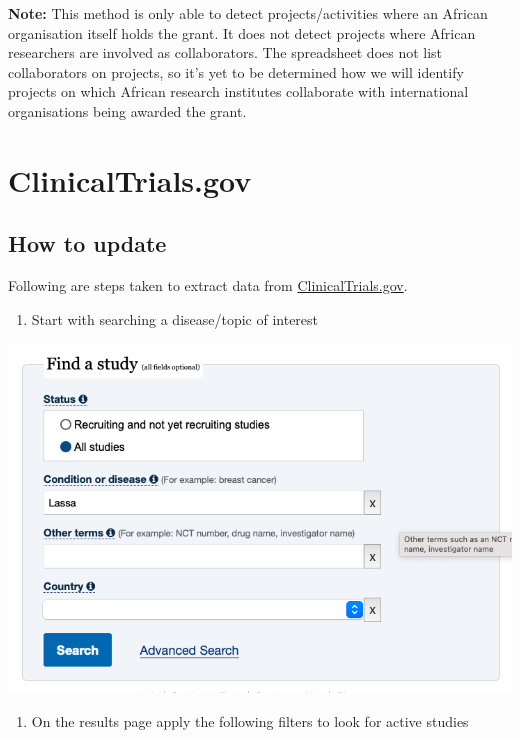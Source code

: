 \documentclass[
]{book}
\providecommand{\tightlist}{%
  \setlength{\itemsep}{0pt}\setlength{\parskip}{0pt}}
\begin{document}
\textbf{Note:} This method is only able to detect projects/activities where an African organisation itself holds the grant. It does not detect projects where African researchers are involved as collaborators. The spreadsheet does not list collaborators on projects, so it's yet to be determined how we will identify projects on which African research institutes collaborate with international organisations being awarded the grant.

\hypertarget{update-clinicaltrials}{%
\section{ClinicalTrials.gov}\label{update-clinicaltrials}}

\hypertarget{how-to-update-1}{%
\subsection{How to update}\label{how-to-update-1}}

Following are steps taken to extract data from \href{https://clinicaltrials.gov/}{ClinicalTrials.gov}.

\begin{enumerate}
\def\labelenumi{\arabic{enumi}.}
\tightlist
\item
  Start with searching a disease/topic of interest
\end{enumerate}

\includegraphics{images/clinicaltrial1.png}

\begin{enumerate}
\def\labelenumi{\arabic{enumi}.}
\setcounter{enumi}{1}
\tightlist
\item
  On the results page apply the following filters to look for active studies
\end{enumerate}
\end{document}
